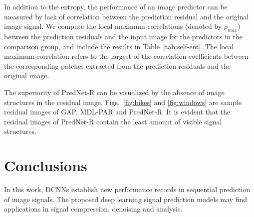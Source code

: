 \documentclass{article}
\begin{document}
In addition to the entropy, the performance of an image predictor can be measured by lack of correlation between the prediction residual and the original image signal. We compute the local maximum correlations (denoted by $\rho_{max}$) between the prediction residuals and the input image for the predictors in the comparison group, and include the results in Table~\ref{tab:self-ent}.  
The local maximum correlation refers to the largest of the correlation coefficients between the corresponding patches extracted from the prediction residuals and the original image.

The superiority of PredNet-R can be visualized by the absence of image structures in the residual image.  Figs.~\ref{fig:bikes} and \ref{fig:windows} are sample residual images of GAP, MDL-PAR and PredNet-R. It is evident that the residual images of PredNet-R contain the least amount of visible signal structures.

\section{Conclusions}
In this work, DCNNs establish new performance records in sequential prediction of image signals.  The proposed deep learning signal prediction models may find applications in signal compression, denoising and analysis.




\end{document}

